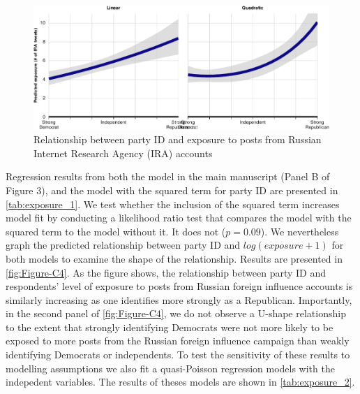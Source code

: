 \documentclass[
  12pt,
]{article}
\begin{document}
\begin{figure}
\centering
\includegraphics{Appendix_files/figure-latex/Figure-C4-1.pdf}
\caption{\label{fig:Figure-C4}Relationship between party ID and exposure to posts from Russian Internet Research Agency (IRA) accounts}
\end{figure}

Regression results from both the model in the main manuscript (Panel B of Figure 3), and the model with the squared term for party ID are presented in \autoref{tab:exposure_1}. We test whether the inclusion of the squared term increases model fit by conducting a likelihood ratio test that compares the model with the squared term to the model without it. It does not (\(p = 0.09\)). We nevertheless graph the predicted relationship between party ID and \(log(exposure + 1)\) for both models to examine the shape of the relationship. Results are presented in \autoref{fig:Figure-C4}. As the figure shows, the relationship between party ID and respondents' level of exposure to posts from Russian foreign influence accounts is similarly increasing as one identifies more strongly as a Republican. Importantly, in the second panel of \autoref{fig:Figure-C4}, we do not observe a U-shape relationship to the extent that strongly identifying Democrats were not more likely to be exposed to more posts from the Russian foreign influence campaign than weakly identifying Democrats or independents. To test the sensitivity of these results to modelling assumptions we also fit a quasi-Poisson regression models with the indepedent variables. The results of theses models are shown in \autoref{tab:exposure_2}.
\end{document}
